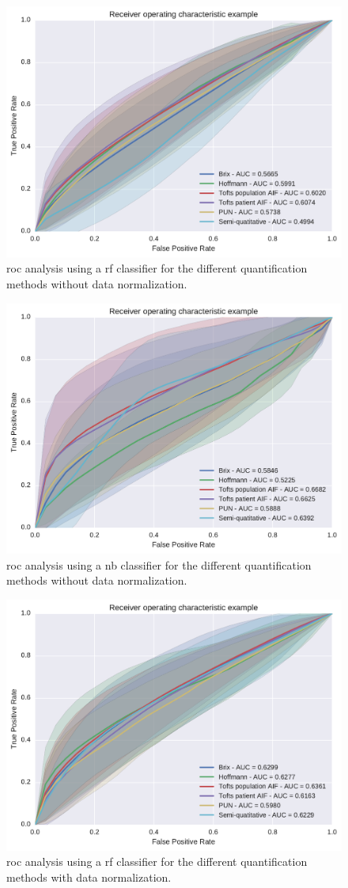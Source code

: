 \begin{figure}
  \centering
  \includegraphics[width=0.7\linewidth]{03_experiments/figures/unormalized/rf.pdf}
  \caption{\acs*{roc} analysis using a \acs*{rf} classifier for the different quantification methods without data normalization.}
  \label{fig:rfunorm}
\end{figure}

\begin{figure}
  \centering
  \includegraphics[width=0.7\linewidth]{03_experiments/figures/unormalized/nb.pdf}
  \caption{\acs*{roc} analysis using a \acs*{nb} classifier for the different quantification methods without data normalization.}
  \label{fig:rfunorm}
\end{figure}

\begin{figure}
  \centering
  \includegraphics[width=0.7\linewidth]{03_experiments/figures/normalized/rf.pdf}
  \caption{\acs*{roc} analysis using a \acs*{rf} classifier for the different quantification methods with data normalization.}
  \label{fig:rfunorm}
\end{figure}

